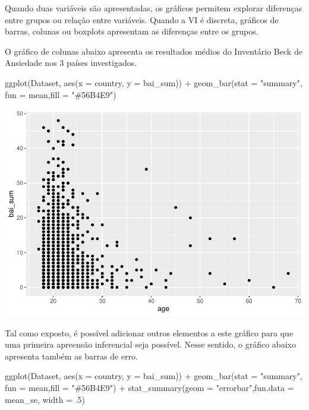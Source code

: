 \documentclass[
]{book}
\newenvironment{Shaded}{\begin{snugshade}}{\end{snugshade}}
\newcommand{\AttributeTok}[1]{\textcolor[rgb]{0.77,0.63,0.00}{#1}}
\newcommand{\DecValTok}[1]{\textcolor[rgb]{0.00,0.00,0.81}{#1}}
\newcommand{\FunctionTok}[1]{\textcolor[rgb]{0.00,0.00,0.00}{#1}}
\newcommand{\NormalTok}[1]{#1}
\newcommand{\SpecialCharTok}[1]{\textcolor[rgb]{0.00,0.00,0.00}{#1}}
\newcommand{\StringTok}[1]{\textcolor[rgb]{0.31,0.60,0.02}{#1}}
\begin{document}
Quando duas variáveis são apresentadas, os gráficos permitem explorar diferenças entre grupos ou relação entre variáveis. Quando a VI é discreta, gráficos de barras, colunas ou boxplots apresentam as diferenças entre os grupos.

O gráfico de colunas abaixo apresenta os resultados médios do Inventário Beck de Ansiedade nos 3 países investigados.

\begin{Shaded}
\begin{Highlighting}[]
\FunctionTok{ggplot}\NormalTok{(Dataset, }\FunctionTok{aes}\NormalTok{(}\AttributeTok{x =}\NormalTok{ country, }\AttributeTok{y =}\NormalTok{ bai\_sum)) }\SpecialCharTok{+}
  \FunctionTok{geom\_bar}\NormalTok{(}\AttributeTok{stat =} \StringTok{"summary"}\NormalTok{, }\AttributeTok{fun =}\NormalTok{ mean,}\AttributeTok{fill =} \StringTok{"\#56B4E9"}\NormalTok{) }
\end{Highlighting}
\end{Shaded}

\begin{center}\includegraphics{gitbook-demo_files/figure-latex/unnamed-chunk-22-1} \end{center}

Tal como exposto, é possível adicionar outros elementos a este gráfico para que uma primeira apreensão inferencial seja possível. Nesse sentido, o gráfico abaixo apresenta também as barras de erro.

\begin{Shaded}
\begin{Highlighting}[]
\FunctionTok{ggplot}\NormalTok{(Dataset, }\FunctionTok{aes}\NormalTok{(}\AttributeTok{x =}\NormalTok{ country, }\AttributeTok{y =}\NormalTok{ bai\_sum)) }\SpecialCharTok{+}
  \FunctionTok{geom\_bar}\NormalTok{(}\AttributeTok{stat =} \StringTok{"summary"}\NormalTok{, }\AttributeTok{fun =}\NormalTok{ mean,}\AttributeTok{fill =} \StringTok{"\#56B4E9"}\NormalTok{) }\SpecialCharTok{+}
  \FunctionTok{stat\_summary}\NormalTok{(}\AttributeTok{geom =} \StringTok{"errorbar"}\NormalTok{,}\AttributeTok{fun.data =}\NormalTok{ mean\_se, }\AttributeTok{width =}\NormalTok{ .}\DecValTok{5}\NormalTok{) }
\end{Highlighting}
\end{Shaded}
\end{document}
